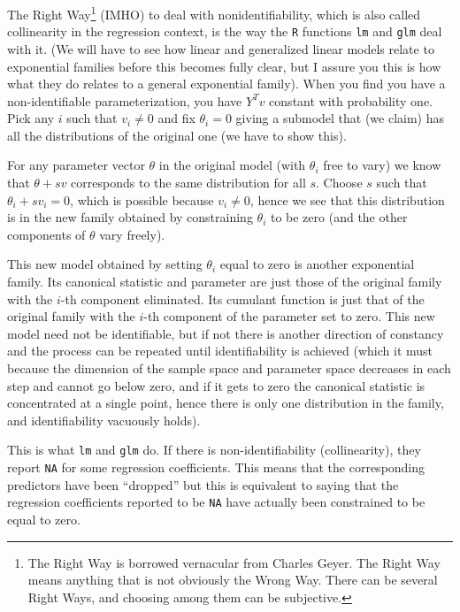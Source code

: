\documentclass[12pt]{article}
\begin{document}
\vspace{0.5cm}The Right Way\footnote{The Right Way is borrowed vernacular from Charles Geyer. The Right Way means anything that is not obviously the Wrong Way. There can be several Right Ways, and choosing among them can be subjective.} (IMHO) to deal with nonidentifiability, which is also called collinearity in the regression context, is the way the \texttt{R} functions \texttt{lm} and \texttt{glm} deal with it. (We will have to see how linear and generalized linear models relate to exponential families before this becomes fully clear, but I assure you this is how what they do relates to a general exponential family). When you find you have a non-identifiable parameterization, you have $Y^Tv$ constant with probability one. Pick any $i$ such that $v_i \neq 0$ and fix $\theta_i = 0$ giving a submodel that (we claim) has all the distributions of the original one (we have to show this).

For any parameter vector $\theta$ in the original model (with $\theta_i$ free to vary) we know that $\theta + sv$ corresponds to the same distribution for all $s$. Choose $s$ such that $\theta_i + sv_i = 0$, which is possible because $v_i  \neq 0$, hence we see that this distribution is in the new family obtained by constraining $\theta_i$ to be zero (and the other components of $\theta$ vary freely). 

This new model obtained by setting $\theta_i$ equal to zero is another exponential family. Its canonical statistic and parameter are just those of the original family with the $i$-th component eliminated. Its cumulant function is just that of the original family with the $i$-th component of the parameter set to zero. This new model need not be identifiable, but if not there is another direction of constancy and the process can be repeated until identifiability is achieved (which it must because the dimension of the sample space and parameter space decreases in each step and cannot go below zero, and if it gets to zero the canonical statistic is concentrated at a single point, hence there is only one distribution in the family, and identifiability vacuously holds).

This is what \texttt{lm} and \texttt{glm} do. If there is non-identifiability (collinearity), they report \texttt{NA} for some regression coefficients. This means that the corresponding predictors have been ``dropped'' but this is equivalent to saying that the regression coefficients reported to be \texttt{NA} have actually been constrained to be equal to zero.
\end{document}

